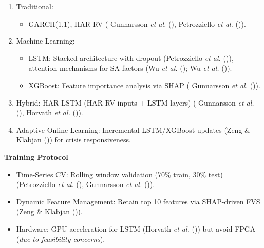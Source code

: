 \documentclass[11pt,preprint]{elsarticle}
\numberwithin{equation}{section}
\numberwithin{figure}{section}
\numberwithin{table}{section}
\def\tightlist{} %
\begin{document}
\begin{enumerate}
\def\labelenumi{\arabic{enumi}.}
\tightlist
\item
  Traditional:

  \begin{itemize}
  \tightlist
  \item
    GARCH(1,1), HAR-RV ( Gunnarsson \emph{et al.}
    (), Petrozziello \emph{et
    al.} ()).\\
  \end{itemize}
\item
  Machine Learning:

  \begin{itemize}
  \tightlist
  \item
    LSTM: Stacked architecture with dropout (Petrozziello \emph{et al.}
    ()), attention
    mechanisms for SA factors (Wu \emph{et al.}
    (); Wu \emph{et al.}
    ()).\\
  \item
    XGBoost: Feature importance analysis via SHAP ( Gunnarsson \emph{et
    al.} ()).\\
  \end{itemize}
\item
  Hybrid: HAR-LSTM (HAR-RV inputs + LSTM layers) ( Gunnarsson \emph{et
  al.} (), Horvath \emph{et
  al.} ()).\\
\item
  Adaptive Online Learning: Incremental LSTM/XGBoost updates (Zeng \&
  Klabjan ()) for crisis responsiveness.
\end{enumerate}

\textbf{Training Protocol}

\begin{itemize}
\tightlist
\item
  Time-Series CV: Rolling window validation (70\% train, 30\% test)
  (Petrozziello \emph{et al.}
  (), Gunnarsson \emph{et
  al.} ()).\\
\item
  Dynamic Feature Management: Retain top 10 features via SHAP-driven FVS
  (Zeng \& Klabjan ()).\\
\item
  Hardware: GPU acceleration for LSTM (Horvath \emph{et al.}
  ()) but avoid FPGA (\emph{due
  to feasibility concerns}).
\end{itemize}
\end{document}
